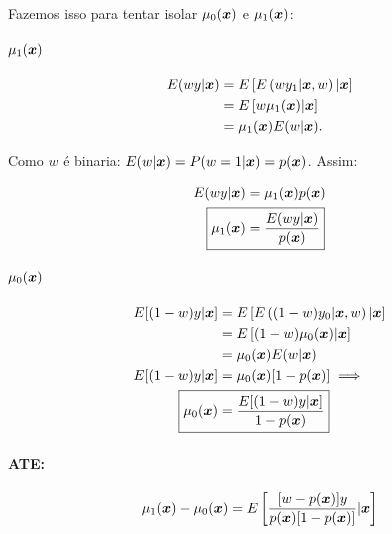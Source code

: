 \documentclass[11pt,oneside,a4paper]{article}
\numberwithin{equation}{section}
\begin{document}
\begin{description}
\begin{description}
Fazemos isso para tentar isolar $\mu_{0}(\boldsymbol{x})$ e $\mu_{1}(\boldsymbol{x})$:

\paragraph{$\mu_{1}( \boldsymbol{x} )$}

\begin{align*}
E( w y | \boldsymbol{x} ) &= E\left[  E \left( w y_{1} | \boldsymbol{x}, w  \right) | \boldsymbol{x} \right]
\\ &=
E \left[ w \mu_{1}(\boldsymbol{x}) | \boldsymbol{x} \right]
\\ &=
\mu_{1}(\boldsymbol{x}) E(w | \boldsymbol{x} ).
\end{align*}

\noindent
Como $w$ é binaria: $E(w| \boldsymbol{x}) = P(w=1 | \boldsymbol{x}) = p(\boldsymbol{x})$.
Assim:

\vspace{-1 em}
\begin{align*}
E( w y | \mbs{x} ) &= \mu_{1}(\mbs{x}) p(\mbs{x})
\\
\Aboxed{ \mu_{1}(\mbs{x}) &= \frac{E(w y | \mbs{x})}{p(\mbs{x})} }
\end{align*}

\paragraph{$\mu_{0}( \boldsymbol{x} )$}

\vspace{-1 em}
\begin{align*}
	E[ (1-w) y | \mbs{x} ] &= E\left[  E \left( (1 - w) y_{0} | \mbs{x}, w  \right) | \mbs{x} \right]
\\ &=
E \left[ (1 - w) \mu_{0}(\mbs{x}) | \mbs{x} \right]
\\ &=
\mu_{0}(\mbs{x}) E(w | \mbs{x} )
\\ 
E[ (1-w) y | \mbs{x} ] 
&=
\mu_{0}(\mbs{x}) [1 - p(\mbs{x})] \implies
\\ 
\Aboxed{
\mu_{0}(\mbs{x})
&=
\frac{E[ (1-w) y | \mbs{x} ] }{1 - p( \mbs{x} ) } }
\end{align*}

\paragraph{ATE:}

\begin{align*}
\mu_{1}(\boldsymbol{x}) - \mu_{0}(\boldsymbol{x}) =
E\left[ 
\frac{[w - p(\boldsymbol{x})] y}{p(\boldsymbol{x}) [1 - p(\boldsymbol{x})]}
| \boldsymbol{x}
\right]
\end{align*}


\end{description}
\end{description}
\end{document}

